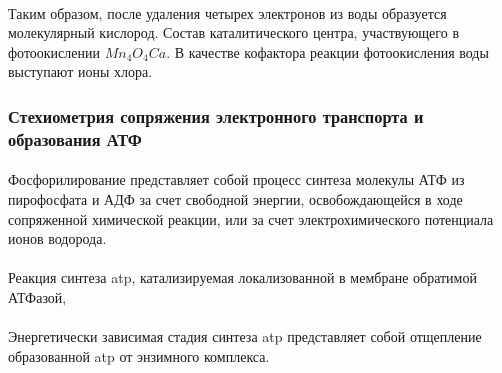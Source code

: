 \paragraph*{}Таким образом, после удаления четырех электронов из воды образуется молекулярный кислород. Состав каталитического центра, участвующего в фотоокислении $Mn_{4}O_{4}Ca$. В качестве кофактора реакции фотоокисления воды выступают ионы хлора. 


\subsubsection*{Стехиометрия сопряжения электронного транспорта и образования АТФ}

\paragraph*{}Фосфорилирование представляет собой процесс синтеза молекулы АТФ из пирофосфата и АДФ за счет свободной энергии, освобождающейся в ходе сопряженной химической реакции, или за счет электрохимического потенциала ионов водорода. 


\paragraph*{}Реакция синтеза \gls{atp}, катализируемая локализованной в мембране обратимой АТФазой, 

\paragraph*{}Энергетически зависимая стадия синтеза \gls{atp} представляет собой отщепление образованной \gls{atp} от энзимного комплекса.


